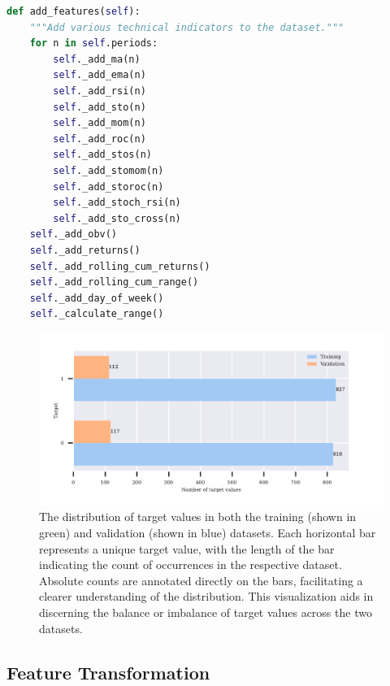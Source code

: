 \begin{lstlisting}[language=Python, caption={Function to add features to the dataset},  captionpos=b, label=lst:add_features_function]
def add_features(self):
    """Add various technical indicators to the dataset."""
    for n in self.periods:
        self._add_ma(n)
        self._add_ema(n)
        self._add_rsi(n)
        self._add_sto(n)
        self._add_mom(n)
        self._add_roc(n)
        self._add_stos(n)
        self._add_stomom(n)
        self._add_storoc(n)
        self._add_stoch_rsi(n)
        self._add_sto_cross(n)
    self._add_obv()
    self._add_returns()
    self._add_rolling_cum_returns()
    self._add_rolling_cum_range()
    self._add_day_of_week()
    self._calculate_range()
\end{lstlisting}



\begin{figure}[h]
\centering
\begin{adjustbox}{max width=1\textwidth,center}
    \includegraphics[scale=1]{./pdf/report/sig_distr.pdf}
\end{adjustbox}
    \caption{The distribution of target values in both the training (shown in green) and validation (shown in blue) datasets. Each horizontal bar represents a unique target value, with the length of the bar indicating the count of occurrences in the respective dataset. Absolute counts are annotated directly on the bars, facilitating a clearer understanding of the distribution. This visualization aids in discerning the balance or imbalance of target values across the two datasets.}
\label{fig:signal_distribution}
\end{figure}

\subsection{Feature Transformation}

